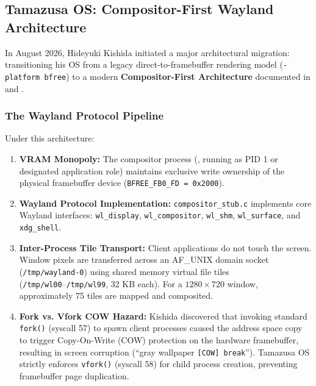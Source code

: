 \documentclass[10pt,journal,compsoc,twocolumn]{article}
\begin{document}
\subsection{Tamazusa OS: Compositor-First Wayland Architecture}
In August 2026, Hideyuki Kishida initiated a major architectural migration: transitioning his OS from a legacy direct-to-framebuffer rendering model (\texttt{-platform bfree}) to a modern \textbf{Compositor-First Architecture} documented in  and .

\subsubsection{The Wayland Protocol Pipeline}
Under this architecture:
\begin{enumerate}[leftmargin=*]
    \item \textbf{VRAM Monopoly:} The compositor process (, running as PID 1 or designated application role) maintains exclusive write ownership of the physical framebuffer device (\texttt{BFREE\_FB0\_FD = 0x2000}).
    \item \textbf{Wayland Protocol Implementation:} \texttt{compositor\_stub.c} implements core Wayland interfaces: \texttt{wl\_display}, \texttt{wl\_compositor}, \texttt{wl\_shm}, \texttt{wl\_surface}, and \texttt{xdg\_shell}.
    \item \textbf{Inter-Process Tile Transport:} Client applications do not touch the screen. Window pixels are transferred across an AF\_UNIX domain socket (\texttt{/tmp/wayland-0}) using shared memory virtual file tiles (\texttt{/tmp/wl00}--\texttt{/tmp/wl99}, 32 KB each). For a $1280 \times 720$ window, approximately 75 tiles are mapped and composited.
    \item \textbf{Fork vs. Vfork COW Hazard:} Kishida discovered that invoking standard \texttt{fork()} (syscall 57) to spawn client processes caused the address space copy to trigger Copy-On-Write (COW) protection on the hardware framebuffer, resulting in screen corruption (``gray wallpaper \texttt{[COW] break}''). Tamazusa OS strictly enforces \texttt{vfork()} (syscall 58) for child process creation, preventing framebuffer page duplication.
\end{enumerate}
\end{document}
